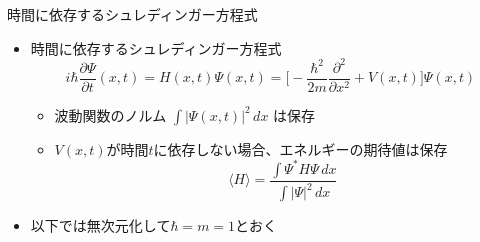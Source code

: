\begin{frame}[t]{時間に依存するシュレディンガー方程式}
  \begin{itemize}
  \item 時間に依存するシュレディンガー方程式
    \[
    i \hbar \frac{\partial \Psi}{\partial t}(x,t) = H(x,t) \Psi(x,t) = \Big[ - \frac{\hbar^2}{2m} \frac{\partial^2}{\partial x^2} + V(x,t) \Big] \Psi(x,t)
    \]
    \begin{itemize}
    \item 波動関数のノルム $\displaystyle \int | \Psi(x,t) |^2 \, dx$ は保存
    \item $V(x,t)$が時間$t$に依存しない場合、エネルギーの期待値は保存
      \[
      \langle H \rangle = \frac{\displaystyle \int \Psi^* H \Psi \, dx}{\displaystyle \int | \Psi |^2 \, dx}
      \]
    \end{itemize}
  \item 以下では無次元化して$\hbar = m = 1$とおく
  \end{itemize}
\end{frame}
